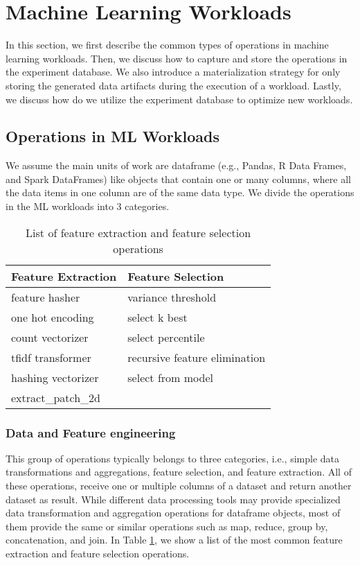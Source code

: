 \section{Machine Learning Workloads} \label{sec-ml-workloads}
In this section, we first describe the common types of operations in machine learning workloads.
Then, we discuss how to capture and store the operations in the experiment database.
We also introduce a materialization strategy for only storing the generated data artifacts during the execution of a workload.
Lastly, we discuss how do we utilize the experiment database to optimize new workloads.

\subsection{Operations in ML Workloads}
We assume the main units of work are dataframe (e.g., Pandas, R Data Frames, and Spark DataFrames) like objects that contain one or many columns, where all the data items in one column are of the same data type.
We divide the operations in the ML workloads into 3 categories.
\begin{table}
\centering
\begin{tabular}{ll}
\hline
	   Feature Extraction & Feature Selection\\ \hline
        feature hasher & variance threshold  \\
        one hot encoding & select k best \\
        count vectorizer& select percentile \\ 
        tfidf transformer & recursive feature elimination \\
        hashing vectorizer & select from model \\
        extract\_patch\_2d &  \\
        \hline
\end{tabular}
\caption{List of feature extraction and feature selection operations}\label{feature-engineering-operations}
\end{table}

\subsubsection{Data and Feature engineering}
This group of operations typically belongs to three categories, i.e., simple data transformations and aggregations, feature selection, and feature extraction.
All of these operations, receive one or multiple columns of a dataset and return another dataset as result. 
While different data processing tools may provide specialized data transformation and aggregation operations for dataframe objects, most of them provide the same or similar operations such as map, reduce, group by, concatenation, and join. 
In Table \ref{feature-engineering-operations}, we show a list of the most common feature extraction and feature selection operations.


